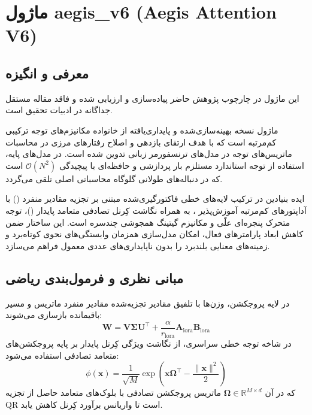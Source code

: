 \section{ماژول aegis\_v6 (Aegis Attention V6)}
\label{sec:module_aegis_v6}

\subsection{معرفی و انگیزه}
این ماژول در چارچوب پژوهش حاضر پیاده‌سازی و ارزیابی شده و فاقد مقاله مستقل جداگانه در ادبیات تحقیق است.

ماژول  نسخه بهینه‌سازی‌شده و پایداری‌یافته از خانواده مکانیزم‌های توجه ترکیبی کم‌مرتبه  است که با هدف ارتقای بازدهی و اصلاح رفتارهای مرزی در محاسبات ماتریس‌های توجه در مدل‌های ترنسفورمر زبانی تدوین شده است. در مدل‌های پایه، استفاده از توجه استاندارد مستلزم بار پردازشی و حافظه‌ای با پیچیدگی $\mathcal{O}(N^2)$ است که در دنباله‌های طولانی گلوگاه محاسباتی اصلی تلقی می‌گردد.

ایده بنیادین در  ترکیب لایه‌های خطی فاکتورگیری‌شده مبتنی بر تجزیه مقادیر منفرد () با آداپتورهای کم‌مرتبه آموزش‌پذیر ، به همراه نگاشت کِرنل تصادفی متعامد پایدار ()، توجه متحرک پنجره‌ای علّی و مکانیزم گیتینگ همجوشی چندسره است. این ساختار ضمن کاهش ابعاد پارامترهای فعال، امکان مدل‌سازی همزمان وابستگی‌های نحوی کوتاه‌برد و زمینه‌های معنایی بلندبرد را بدون ناپایداری‌های عددی معمول فراهم می‌سازد.

\subsection{مبانی نظری و فرمول‌بندی ریاضی}
در لایه پروجکشن، وزن‌ها با تلفیق مقادیر تجزیه‌شده مقادیر منفرد ماتریس و مسیر باقیمانده بازسازی می‌شوند:
\begin{equation}
\mathbf{W} = \mathbf{V} \mathbf{\Sigma} \mathbf{U}^\top + \frac{\alpha}{r_{\text{lora}}} \mathbf{A}_{\text{lora}} \mathbf{B}_{\text{lora}}
\end{equation}
در شاخه توجه خطی سراسری، از نگاشت ویژگی کِرنل پایدار بر پایه پروجکشن‌های متعامد تصادفی استفاده می‌شود:
\begin{equation}
\phi(\mathbf{x}) = \frac{1}{\sqrt{M}} \exp\left( \mathbf{x} \mathbf{\Omega}^\top - \frac{\|\mathbf{x}\|^2}{2} \right)
\end{equation}
که در آن $\mathbf{\Omega} \in \mathbb{R}^{M \times d}$ ماتریس پروجکشن تصادفی با بلوک‌های متعامد حاصل از تجزیه QR است تا واریانس برآورد کِرنل کاهش یابد.

